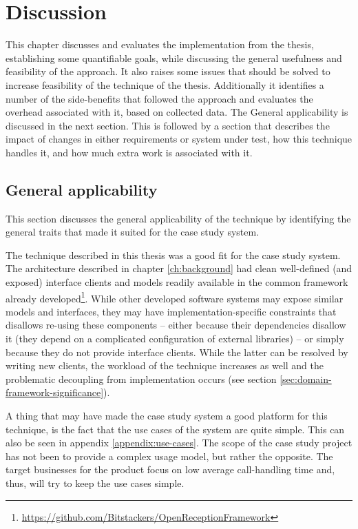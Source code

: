 \chapter{Discussion}

This chapter discusses and evaluates the implementation from the thesis, establishing some quantifiable goals, while discussing the general usefulness and feasibility of the approach. It also raises some issues that should be solved to increase feasibility of the technique of the thesis. Additionally it identifies a number of the side-benefits that followed the approach and evaluates the overhead associated with it, based on collected data. The General applicability is discussed in the next section. This is followed by a section that describes the impact of changes in either requirements or system under test, how this technique handles it, and how much extra work is associated with it.

\section{General applicability}
This section discusses the general applicability of the technique by identifying the general traits that made it suited for the case study system.\medskip

\noindent 
The technique described in this thesis was a good fit for the case study system. The architecture described in chapter \ref{ch:background} had clean well-defined (and exposed) interface clients and models readily available in the common framework already developed\footnote{\url{https://github.com/Bitstackers/OpenReceptionFramework}}. While other developed software systems may expose similar models and interfaces, they may have implementation-specific constraints that disallows re-using these components -- either because their dependencies disallow it (they depend on a complicated configuration of external libraries) -- or simply because they do not provide interface clients. While the latter can be resolved by writing new clients, the workload of the technique increases as well and the problematic decoupling from implementation occurs (see section \ref{sec:domain-framework-significance}).

\noindent
A thing that may have made the case study system a good platform for this technique, is the fact that the use cases of the system are quite simple. This can also be seen in appendix \ref{appendix:use-cases}. The scope of the case study project has not been to provide a complex usage model, but rather the opposite. The target businesses for the product focus on low average call-handling time and, thus, will try to keep the use cases simple.\medskip

